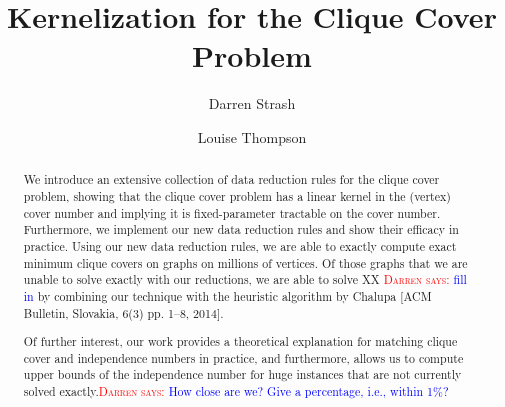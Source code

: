 \documentclass[sigconf]{acmart}
\newif\ifDoubleBlind
\newcommand{\niceremark}[3]{\textcolor{red}{\textsc{#1 #2: }}\textcolor{blue}{\textsf{#3}}}
\newcommand{\darren}[2][says]{\niceremark{Darren}{#1}{#2}}
\begin{document}
\title{Kernelization for the Clique Cover Problem}

\date{}

\pagestyle{plain}

\ifDoubleBlind
\author{}

\else
\author{Darren Strash}
\author{Louise Thompson}
\authornotemark[1]

\fi{}%

\renewcommand{\shortauthors}{Strash and Thompson}

\begin{abstract}
We introduce an extensive collection of data reduction rules for the clique cover problem, showing that the clique cover problem has a linear kernel in the (vertex) cover number and implying it is fixed-parameter tractable on the cover number. Furthermore, we implement our new data reduction rules and show their efficacy in practice. Using our new data reduction rules, we are able to exactly compute exact minimum clique covers on graphs on millions of vertices. Of those graphs that we are unable to solve exactly with our reductions, we are able to solve XX \darren{fill in} by combining our technique with the heuristic algorithm by Chalupa [ACM Bulletin, Slovakia, 6(3) pp. 1--8, 2014]. 

Of further interest, our work provides a theoretical explanation for matching clique cover and independence numbers in practice, and furthermore, allows us to compute upper bounds of the independence number for huge instances that are not currently solved exactly.\darren{How close are we? Give a percentage, i.e., within 1\%?}
\end{abstract}
\end{document}
